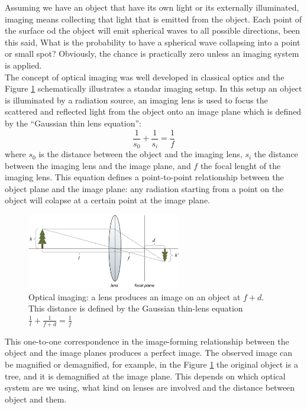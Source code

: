 Assuming we have an object that have its own light or its externally illuminated,
imaging means collecting that light that is emitted from the object. Each point
of the surface od the object will emit spherical waves to all possible directions,
been this said, What is the probability to have a spherical wave collapsing into a point or small spot? 
Obviously, the chance is practically zero unless an imaging system is applied.
\\
The concept of optical imaging was well developed in classical optics and the Figure
\ref{fig:imaging} schematically illustrates a standar imaging setup. In this setup 
an object is illuminated by a radiation source, an imaging lens is used 
to focus the scattered and reflected light from the object onto an image plane 
which is defined by the “Gaussian thin lens equation”\cite{hecht}:
\begin{equation}
\frac{1}{s_0}+\frac{1}{s_i}=\frac{1}{f}
\end{equation}
 where $s_0$ is the distance between the object and the imaging lens, $s_i$ the distance 
between the imaging lens and the image plane, and $f$ the focal lenght of the imaging lens. This equation defines
a point-to-point relationship between the object plane and the image plane: any radiation starting from a point on the object will colapse at a certain point at the image plane.
\\
\begin{figure}[h!]
\centering
\includegraphics[width=0.6\textwidth]{Figures/imaging.png}
\caption{Optical imaging: a lens produces an image on an object at $f+d$. This distance is defined
by the Gaussian thin-lens equation $\frac{1}{l}+\frac{1}{f+d}=\frac{1}{f}$} 
\label{fig:imaging}
\end{figure}
This one-to-one correspondence in the image-forming relationship between the object and the image planes produces a perfect image.
The observed image can be magnified or demagnified, for example, in the 
Figure \ref{fig:imaging} the original object is a tree, and it is demagnified at the image plane. This depends on which optical 
system are we using, what kind on lenses are involved and the distance between object and them.

